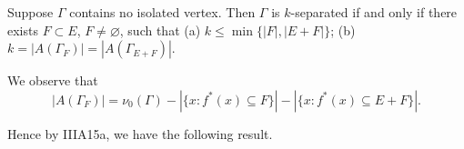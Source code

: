 Suppose $\Gamma$ contains no isolated vertex. Then $\Gamma$ is $k$-separated if and only if there exists $F \subset E$, $F \neq \varnothing$, such that
(a) $k \leq \min\{|F|, |E + F|\}$;
(b) $k = |A(\Gamma_F)| = |A(\Gamma_{E+F})|$.

We observe that
$$|A(\Gamma_F)| = \nu_0(\Gamma) - |\{x: f^*(x) \subseteq F\}| - |\{x: f^*(x) \subseteq E + F\}|.$$

Hence by IIIA15a, we have the following result.
